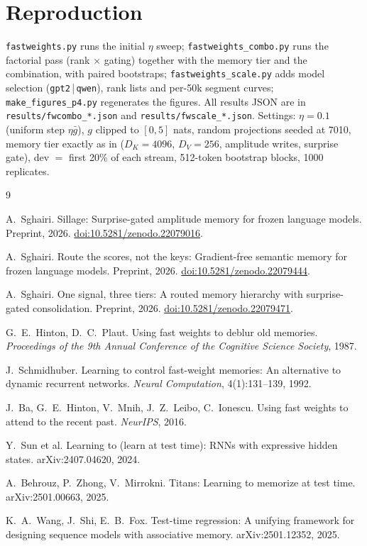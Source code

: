 \documentclass[11pt]{article}
\begin{document}
\appendix

\section{Reproduction}

\texttt{fastweights.py} runs the initial $\eta$ sweep; \texttt{fastweights\_combo.py} runs the factorial pass (rank $\times$ gating) together with the memory tier and the combination, with paired bootstraps; \texttt{fastweights\_scale.py} adds model selection (\texttt{gpt2}\,|\,\texttt{qwen}), rank lists and per-50k segment curves; \texttt{make\_figures\_p4.py} regenerates the figures. All results JSON are in \texttt{results/fwcombo\_*.json} and \texttt{results/fwscale\_*.json}. Settings: $\eta = 0.1$ (uniform step $\eta\bar{g}$), $g$ clipped to $[0,5]$ nats, random projections seeded at 7010, memory tier exactly as in \cite{sillage} ($D_K = 4096$, $D_V = 256$, amplitude writes, surprise gate), dev $=$ first 20\% of each stream, 512-token bootstrap blocks, 1000 replicates.

\begin{thebibliography}{9}\small

 A.~Sghairi. Sillage: Surprise-gated amplitude memory for frozen language models. Preprint, 2026. \href{https://doi.org/10.5281/zenodo.22079016}{doi:10.5281/zenodo.22079016}.

 A.~Sghairi. Route the scores, not the keys: Gradient-free semantic memory for frozen language models. Preprint, 2026. \href{https://doi.org/10.5281/zenodo.22079444}{doi:10.5281/zenodo.22079444}.

 A.~Sghairi. One signal, three tiers: A routed memory hierarchy with surprise-gated consolidation. Preprint, 2026. \href{https://doi.org/10.5281/zenodo.22079471}{doi:10.5281/zenodo.22079471}.

 G.~E.~Hinton, D.~C.~Plaut. Using fast weights to deblur old memories. \emph{Proceedings of the 9th Annual Conference of the Cognitive Science Society}, 1987.

 J.~Schmidhuber. Learning to control fast-weight memories: An alternative to dynamic recurrent networks. \emph{Neural Computation}, 4(1):131--139, 1992.

 J.~Ba, G.~E.~Hinton, V.~Mnih, J.~Z.~Leibo, C.~Ionescu. Using fast weights to attend to the recent past. \emph{NeurIPS}, 2016.

 Y.~Sun et al. Learning to (learn at test time): RNNs with expressive hidden states. arXiv:2407.04620, 2024.

 A.~Behrouz, P.~Zhong, V.~Mirrokni. Titans: Learning to memorize at test time. arXiv:2501.00663, 2025.

 K.~A.~Wang, J.~Shi, E.~B.~Fox. Test-time regression: A unifying framework for designing sequence models with associative memory. arXiv:2501.12352, 2025.

\end{thebibliography}
\end{document}

